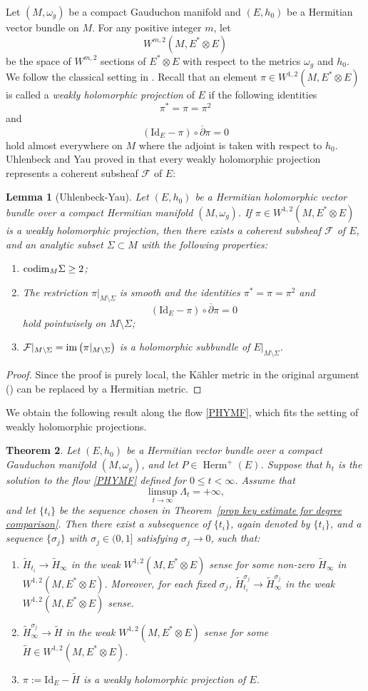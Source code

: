 \documentclass[12pt, reqno]{amsart}
\newcommand\cF{{\mathcal F}}
\newcommand{\codim}{{\rm codim}}
\newcommand{\im}{{\rm im}}
\newcommand\bp{{\bar\partial}}
\theoremstyle{plain}
\newtheorem{thm}{Theorem}[section]
\newtheorem{lemma}[thm]{Lemma}
\theoremstyle{definition}
\newcommand{\btheorem}{\begin{thm}}
\newcommand{\etheorem}{\end{thm}}
\newcommand{\bproof}{\begin{proof}}
\newcommand{\eproof}{\end{proof}}
\newcommand{\elemma}{\end{lemma}}
\newcommand{\blemma}{\begin{lemma}}
\renewcommand{\bar}{\overline}
\newcommand{\beq}{\begin{equation}}
\newcommand{\eeq}{\end{equation}}
\newcommand{\bd}{\begin{enumerate}}
\newcommand{\ed}{\end{enumerate}}
\renewcommand{\tilde}{\widetilde}
\renewcommand{\bp}{\bar{\partial}}
\newcommand{\ts}{\otimes}
\renewcommand{\>}{\rightarrow}
\renewcommand{\>}{\rightarrow}
\renewcommand{\bp}{{\bar{\partial}}}
\newcommand{\om}{\omega}
\renewcommand{\bar}{\overline}
\renewcommand{\tilde}{\widetilde}
\numberwithin{equation}{section} %
\begin{document}
Let $(M,\om_g)$ be a compact Gauduchon manifold and $(E,h_0)$ be a Hermitian vector bundle on $M$. For any positive integer $m$, let
\beq W^{m,2}(M, E^*\ts E)\eeq
be the space of $W^{m,2}$ sections of $E^*\ts E$ with respect to the metrics $\omega_g$ and $h_0$. We follow the classical setting in \cite{UY86}.
Recall that an element $\pi\in W^{1,2}(M,E^*\ts E)$ is called a \emph{weakly holomorphic projection} of $E$ if the following identities
\beq
\pi^*=\pi=\pi^2\eeq and \beq  \left(\mathrm{Id}_E-\pi\right)\circ\bp\pi =0
\eeq
hold almost everywhere on $M$ where the adjoint is taken with respect to $h_0$. Uhlenbeck and Yau proved in \cite{UY86}  that every weakly holomorphic projection represents a coherent subsheaf $\cF$ of $E$:

\blemma[Uhlenbeck-Yau] \label{lem weakly holomorphic subbundle}
Let $(E,h_0)$ be a Hermitian holomorphic vector bundle over a compact Hermitian manifold $(M, \om_g)$.
If  $\pi\in W^{1,2}(M,E^*\ts E)$ is a weakly holomorphic projection,
then there exists a coherent subsheaf $\cF$ of $E$, and an analytic subset $\Sigma\subset M$ with the following properties:
\bd
\item $\codim_M \Sigma\geq 2$;
\item The restriction $\pi|_{M \setminus \Sigma}$ is smooth and the identities  $\pi^* = \pi = \pi^2$ and $$\left(\mathrm{Id}_E-\pi\right)\circ\bp\pi= 0$$ hold   pointwisely on $M \setminus \Sigma$;
\item $\cF|_{M\setminus \Sigma}=\im\left(\pi|_{M\setminus \Sigma}\right)$ is a holomorphic subbundle of $E|_{M\setminus \Sigma}$.
\ed
\elemma

\bproof Since the proof is purely local, the K\"ahler metric in the original argument (\cite{UY86}) can be replaced by a Hermitian metric.
\eproof

\noindent We obtain the following result along the flow \eqref{PHYMF}, which fits the setting of weakly holomorphic projections.
\btheorem \label{thm convergent subsequence}
Let $(E, h_0)$ be a Hermitian vector bundle over a compact Gauduchon manifold
$(M, \omega_g)$, and let $P \in \operatorname{Herm}^+(E)$.
Suppose that $h_t$ is the solution to the flow \eqref{PHYMF} defined for $0 \leq t < \infty$.
Assume that
\begin{equation}
\limsup_{t\to\infty} \Lambda_t = +\infty,
\end{equation}
and let $\{t_i\}$ be the sequence chosen in Theorem~\ref{prop key estimate for degree comparison}.
Then there exist a subsequence of $\{t_i\}$, again denoted by $\{t_i\}$, and a sequence $\{\sigma_j\}$
with $\sigma_j \in (0,1]$ satisfying $\sigma_j \to 0$, such that:
\bd
\item $\tilde H_{t_i}\> \tilde H_\infty$ in the weak  $W^{1,2}(M,E^*\ts E)$ sense for some non-zero $\tilde H_\infty$ in $W^{1,2}(M,E^*\ts E)$.
Moreover, for each fixed $\sigma_j$, $\tilde H_{t_i}^{\sigma_j}\> \tilde H^{\sigma_j}_\infty$ in the weak  $W^{1,2}(M,E^*\ts E)$ sense.
\item $\tilde H_\infty^{\sigma_j}\> \tilde H$ in the weak $W^{1,2}(M,E^*\ts E)$ sense for some $\tilde H\in W^{1,2}(M,E^*\ts E)$.
\item $\pi:=\mathrm{Id}_E-\tilde H$ is a weakly holomorphic projection of $E$.
\ed
\etheorem
\end{document}
